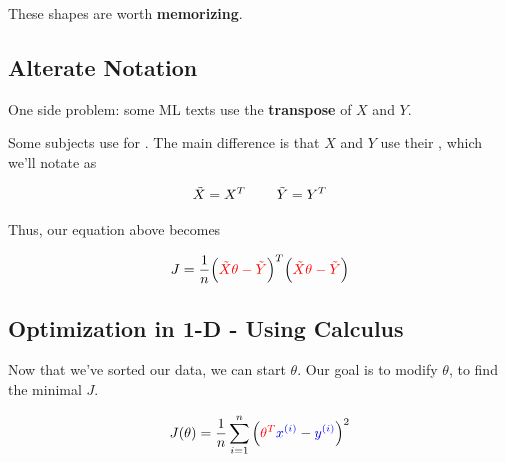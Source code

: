         
        These shapes are worth \textbf{memorizing}.

        \phantom{}
        
    \subsection{Alterate Notation}
    
        One side problem: some ML texts use the \textbf{transpose} of $X$ and $Y$.\\
    
        \begin{notation}
            Some subjects use  for . The main difference is that $X$ and $Y$ use their , which we'll notate as
        
            \begin{equation*}
                \tilde{X} = X^T \;\;\;\;\;\;\;\; \tilde{Y} = Y^T
            \end{equation*}
            
            Thus, our equation above becomes
            
            \begin{equation*}
                J = \frac{1}{n}
                    \Big( \textcolor{red}{ \tilde{X} \theta  - \tilde{Y} } \Big)^T
                    \Big( \textcolor{red}{ \tilde{X} \theta  - \tilde{Y} } \Big) 
            \end{equation*}
        \end{notation}

    \pagebreak
        
    \subsection{Optimization in 1-D - Using Calculus}

        Now that we've sorted our data, we can start  $\theta$. Our goal is to modify $\theta$, to find the minimal $J$.

        \begin{equation}
                J(\theta) = 
                \frac{1}{n}  \sum_{i=1}^n 
                \left( \textcolor{red}{\theta^T} \textcolor{blue}{x^{(i)}}  
                - \textcolor{blue}{y^{(i)}} \right)^2 
            \end{equation}
        
